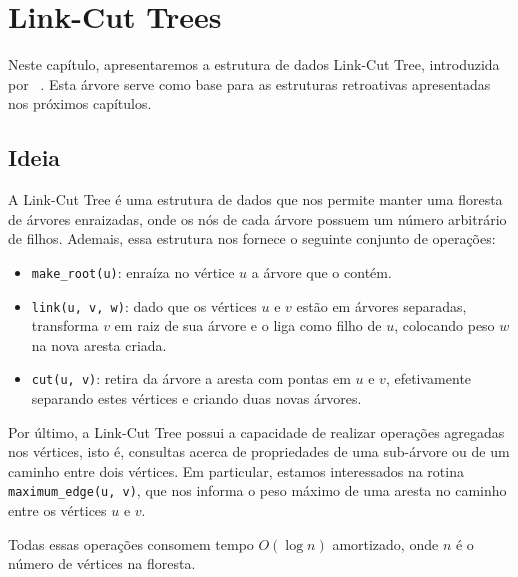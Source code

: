 
\chapter{Link-Cut Trees}
\label{cap:link-cut-trees}

Neste capítulo, apresentaremos a estrutura de dados Link-Cut Tree, introduzida por ~\citet{10.1145/800076.802464}. Esta árvore serve como base para as estruturas retroativas apresentadas nos próximos capítulos.

\section{Ideia}
\label{sec:lct-ideia}

A Link-Cut Tree é uma estrutura de dados que nos permite manter uma floresta de árvores enraizadas, onde os nós de cada árvore possuem um número arbitrário de filhos. Ademais, essa estrutura nos fornece o seguinte conjunto de operações:

\begin{itemize}
    \item \texttt{make\_root(u)}: enraíza no vértice $u$ a árvore que o contém.
    \item \texttt{link(u, v, w)}: dado que os vértices $u$ e $v$ estão em árvores separadas, transforma $v$ em raiz de sua árvore e o liga como filho de $u$, colocando peso $w$ na nova aresta criada.
    \item \texttt{cut(u, v)}: retira da árvore a aresta com pontas em $u$ e $v$, efetivamente separando estes vértices e criando duas novas árvores.
\end{itemize}

Por último, a Link-Cut Tree possui a capacidade de realizar operações agregadas nos vértices, isto é, consultas acerca de propriedades de uma sub-árvore ou de um caminho entre dois vértices. Em particular, estamos interessados na rotina \texttt{maximum\_edge(u, v)}, que nos informa o peso máximo de uma aresta no caminho entre os vértices $u$ e $v$.

Todas essas operações consomem tempo $O(\log n)$ amortizado, onde $n$ é o número de vértices na floresta.

